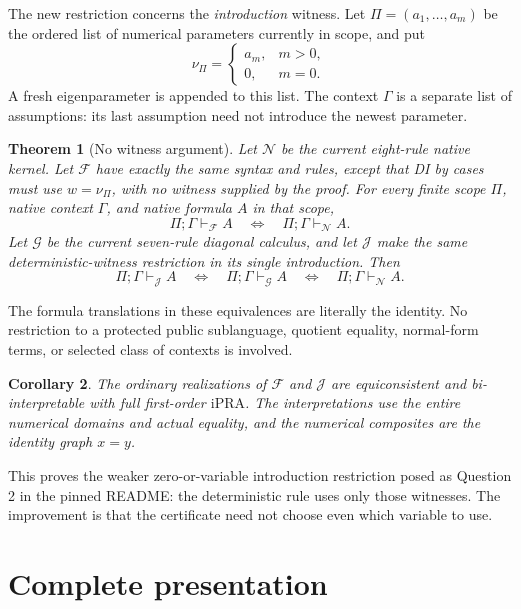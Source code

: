 \documentclass[11pt]{article}
\newtheorem{theorem}{Theorem}
\newtheorem{corollary}[theorem]{Corollary}
\newcommand{\Ncal}{\mathcal N}
\newcommand{\Fcal}{\mathcal F}
\newcommand{\Gcal}{\mathcal G}
\newcommand{\Jcal}{\mathcal J}
\newcommand{\ipra}{\mathrm{iPRA}}
\newcommand{\seq}[1]{\mathrel{\vdash_{#1}}}
\newcommand{\newest}{\nu_{\Pi}}
\begin{document}
The new restriction concerns the \emph{introduction} witness. Let
\(\Pi=(a_1,\ldots,a_m)\) be the ordered list of numerical parameters currently
in scope, and put
\[
 \newest=
 \begin{cases}
   a_m,&m>0,\\
   0,&m=0.
 \end{cases}
\]
A fresh eigenparameter is appended to this list. The context \(\Gamma\) is
a separate list of assumptions: its last assumption need not introduce the
newest parameter.

\begin{theorem}[No witness argument]\label{thm:main}
Let \(\Ncal\) be the current eight-rule native kernel. Let \(\Fcal\) have
exactly the same syntax and rules, except that DI by cases must use
\(w=\newest\), with no witness supplied by the proof.
For every finite scope \(\Pi\), native context \(\Gamma\), and native formula
\(A\) in that scope,
\[
 \Pi;\Gamma\seq{\Fcal} A
 \quad\Longleftrightarrow\quad
 \Pi;\Gamma\seq{\Ncal} A.
\]
Let \(\Gcal\) be the current seven-rule diagonal calculus, and let \(\Jcal\)
make the same deterministic-witness restriction in its single introduction.
Then
\[
 \Pi;\Gamma\seq{\Jcal} A
 \quad\Longleftrightarrow\quad
 \Pi;\Gamma\seq{\Gcal} A
 \quad\Longleftrightarrow\quad
 \Pi;\Gamma\seq{\Ncal} A.
\]
\end{theorem}

The formula translations in these equivalences are literally the identity.
No restriction to a protected public sublanguage, quotient equality,
normal-form terms, or selected class of contexts is involved.

\begin{corollary}\label{cor:bi}
The ordinary realizations of \(\Fcal\) and \(\Jcal\) are equiconsistent and
bi-interpretable with full first-order \(\ipra\). The interpretations use
the entire numerical domains and actual equality, and the numerical
composites are the identity graph \(x=y\).
\end{corollary}

This proves the weaker zero-or-variable introduction restriction posed
as Question 2 in the pinned README: the deterministic rule uses only those
witnesses. The improvement is that the certificate need not choose even
which variable to use.

\section{Complete presentation}
\end{document}
